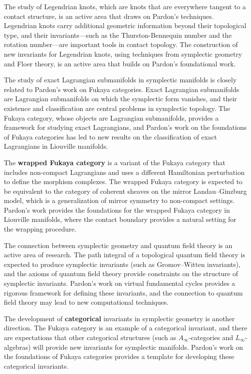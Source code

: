 The study of Legendrian knots, which are knots that are everywhere tangent to a contact structure, is an active area that draws on Pardon's techniques. Legendrian knots carry additional geometric information beyond their topological type, and their invariants---such as the Thurston-Bennequin number and the rotation number---are important tools in contact topology. The construction of new invariants for Legendrian knots, using techniques from symplectic geometry and Floer theory, is an active area that builds on Pardon's foundational work.

The study of exact Lagrangian submanifolds in symplectic manifolds is closely related to Pardon's work on Fukaya categories. Exact Lagrangian submanifolds are Lagrangian submanifolds on which the symplectic form vanishes, and their existence and classification are central problems in symplectic topology. The Fukaya category, whose objects are Lagrangian submanifolds, provides a framework for studying exact Lagrangians, and Pardon's work on the foundations of Fukaya categories has led to new results on the classification of exact Lagrangians in Liouville manifolds.

The \textbf{wrapped Fukaya category} is a variant of the Fukaya category that includes non-compact Lagrangians and uses a different Hamiltonian perturbation to define the morphism complexes. The wrapped Fukaya category is expected to be equivalent to the category of coherent sheaves on the mirror Landau--Ginzburg model, which is a generalization of mirror symmetry to non-compact settings. Pardon's work provides the foundations for the wrapped Fukaya category in Liouville manifolds, where the contact boundary provides a natural setting for the wrapping procedure.

The connection between symplectic geometry and quantum field theory is an active area of research. The path integral of a topological quantum field theory is expected to produce symplectic invariants (such as Gromov--Witten invariants), and the axioms of quantum field theory provide constraints on the structure of symplectic invariants. Pardon's work on virtual fundamental cycles provides a rigorous framework for defining these invariants, and the connection to quantum field theory may lead to new computational techniques.

The development of \textbf{categorical} invariants in symplectic geometry is another direction. The Fukaya category is an example of a categorical invariant, and there are expectations that other categorical structures (such as $A_\infty$-categories and $L_\infty$-algebras) will provide new invariants for symplectic manifolds. Pardon's work on the foundations of Fukaya categories provides a template for developing these categorical invariants.

